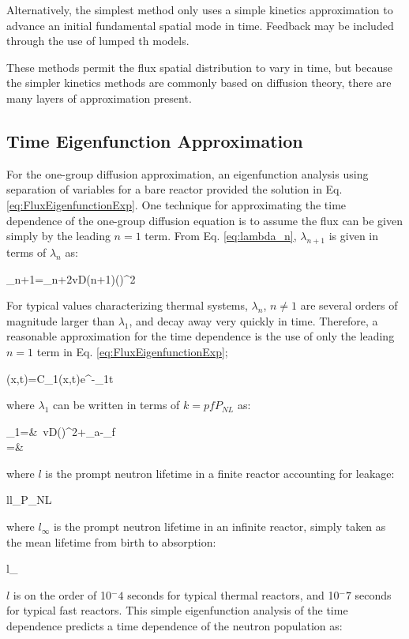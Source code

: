 Alternatively, the simplest method only uses a simple kinetics approximation to advance an initial fundamental spatial mode in time. Feedback may be included through the use of lumped \gls{th} models. 

These methods permit the flux spatial distribution to vary in time, but because the simpler kinetics methods are commonly based on diffusion theory, there are many layers of approximation present. 

\subsection{Time Eigenfunction Approximation}

For the one-group diffusion approximation, an eigenfunction analysis using separation of variables for a bare reactor provided the solution in Eq. \eqref{eq:FluxEigenfunctionExp}. One technique for approximating the time dependence of the one-group diffusion equation is to assume the flux can be given simply by the leading \(n=1\) term. From Eq. \eqref{eq:lambda_n}, \(\lambda_{n+1}\) is given in terms of \(\lambda_n\) as:

\beq
\lambda_{n+1}=\lambda_n+2vD(n+1)\left(\right)^2
\eeq

For typical values characterizing thermal systems, \(\lambda_{n}\), \(n\neq1\) are several orders of magnitude larger than \(\lambda_1\), and decay away very quickly in time. Therefore, a reasonable approximation for the time dependence is the use of only the leading \(n=1\) term in Eq. \eqref{eq:FluxEigenfunctionExp};

\beq
\phi(x,t)=C_1(x,t)e^{-\lambda_1t}
\eeq

where \(\lambda_1\) can be written in terms of \(k=pfP_{NL}\) as:

\beqa
\lambda_1=&\ v\left\lbrack D\left(\right)^2+\Sigma_a-\nu\Sigma_f\right\rbrack\\
=&\ 
\eeqa

where \(l\) is the prompt neutron lifetime in a finite reactor accounting for leakage:

\beq
l\equiv l_\infty P_{NL}
\eeq

where \(l_\infty\) is the prompt neutron lifetime in an infinite reactor, simply taken as the mean lifetime from birth to absorption:

\beq
l_\infty\equiv{}
\eeq

\(l\) is on the order of 10$^-4$ seconds for typical thermal reactors, and 10$^-7$ seconds for typical fast reactors. This simple eigenfunction analysis of the time dependence predicts a time dependence of the neutron population as:


